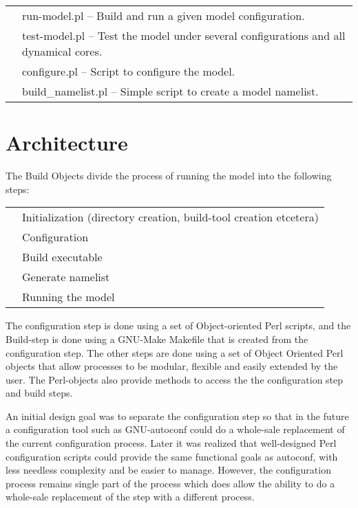 \documentclass[]{article}
\begin{document}
\begin{tabular}{r p{3.7in}}
	& run-model.pl -- Build and run a given model configuration. \\
	& test-model.pl -- Test the model under several configurations and all dynamical cores. \\
	& configure.pl -- Script to configure the model. \\
	& build\_namelist.pl -- Simple script to create a model namelist. \\
\end{tabular}

\section{Architecture}

The Build Objects divide the process of running the model into the
following steps:\\
\begin{tabular}{r p{3.7in}}
         	&  Initialization (directory creation, build-tool creation etcetera) \\
                &  Configuration\\
                &  Build executable\\
                &  Generate namelist\\
                &  Running the model
\end{tabular}

The configuration step is done using a set of Object-oriented Perl scripts, and the 
Build-step is done using a GNU-Make Makefile that is created from the configuration
step. The other steps are done 
using a set of Object Oriented Perl objects that allow processes to be 
modular, flexible and easily extended by the user. The Perl-objects
also provide methods to access the the configuration step and build
steps.

An initial design goal was to separate the configuration step so
that in the future a configuration tool such as GNU-autoconf could do
a whole-sale replacement of the current configuration process. Later
it was realized that well-designed Perl configuration scripts could
provide the same functional goals as autoconf, with less needless complexity
and be easier to manage. However, the configuration process remains
single part of the process which does allow the ability to do a whole-sale
replacement of the step with a different process.
\end{document}
